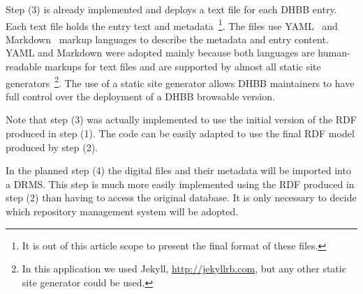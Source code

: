 Step (3) is already implemented and deploys a text file for each DHBB
entry. Each text file holds the entry text and metadata~\footnote{It
  is out of this article scope to present the final format of these
  files.}.  The files use YAML~\cite{yaml} and
Markdown~\cite{markdown} markup languages to describe the metadata and
entry content. YAML and Markdown were adopted mainly because both
languages are human-readable markups for text files and are supported
by almost all static site generators~\footnote{In this application we
  used Jekyll, \url{http://jekyllrb.com}, but any other static site
  generator could be used.}. The use of a static site generator allows
DHBB maintainers to have full control over the deployment of a DHBB
browsable version.



Note that step (3) was actually implemented to use the initial version
of the RDF produced in step (1). The code can be easily adapted to use
the final RDF model produced by step (2).

In the planned step (4) the digital files and their metadata will be
imported into a DRMS. This step is much more easily implemented using
the RDF produced in step (2) than having to access the original
database. It is only necessary to decide which repository management
system will be adopted.



